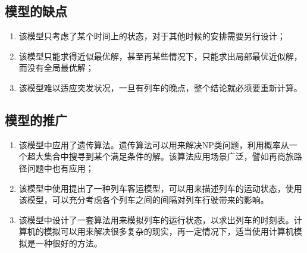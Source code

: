 \subsection{模型的缺点}

\begin{enumerate}
    \item 该模型只考虑了某个时间上的状态，对于其他时候的安排需要另行设计；
    \item 该模型只能求得近似最优解，甚至再某些情况下，只能求出局部最优近似解，而没有全局最优解；
    \item 该模型难以适应突发状况，一旦有列车的晚点，整个结论就必须要重新计算。
\end{enumerate}

\subsection{模型的推广}

\begin{enumerate}
    \item 该模型中应用了遗传算法。遗传算法可以用来解决NP类问题，利用概率从一个超大集合中搜寻到某个满足条件的解。该算法应用场景广泛，譬如再商旅路径问题中也有应用；
    \item 该模型中使用提出了一种列车客运模型，可以用来描述列车的运动状态，使用该模型，可以充分考虑各个列车之间的间隔对列车行驶带来的影响。
    \item 该模型中设计了一套算法用来模拟列车的运行状态，以求出列车的时刻表。计算机的模拟可以用来解决很多复杂的现实，再一定情况下，适当使用计算机模拟是一种很好的方法。
\end{enumerate}